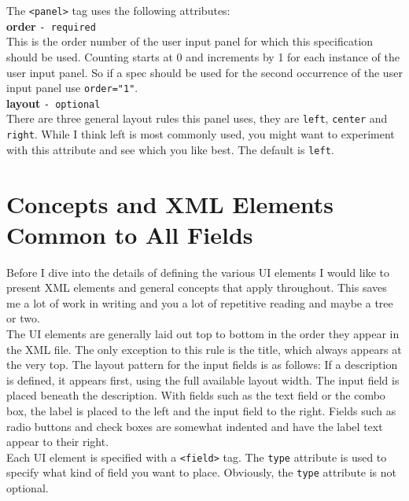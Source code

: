 The \texttt{<panel>} tag uses the following attributes:\\

\textbf{order} \texttt{- required}\\

This is the order number of the user input panel for which this
specification should be used. Counting starts at 0 and increments by 1
for each instance of the user input panel. So if a spec should be used
for the second occurrence of the user input panel use
\texttt{order="1"}.\\

\textbf{layout} \texttt{- optional}\\

There are three general layout rules this panel uses, they are
\texttt{left}, \texttt{center} and \texttt{right}. While I think left is
most commonly used, you might want to experiment with this attribute and
see which you like best. The default is \texttt{left}.\\


\section{Concepts and XML Elements Common to All Fields}

Before I dive into the details of defining the various UI elements I
would like to present XML elements and general concepts that apply
throughout. This saves me a lot of work in writing and you a lot of
repetitive reading and maybe a tree or two.\\

The UI elements are generally laid out top to bottom in the order they
appear in the XML file. The only exception to this rule is the title,
which always appears at the very top. The layout pattern for the input
fields is as follows: If a description is defined, it appears first,
using the full available layout width. The input field is placed beneath
the description. With fields such as the text field or the combo box,
the label is placed to the left and the input field to the right. Fields
such as radio buttons and check boxes are somewhat indented and have the
label text appear to their right.\\

Each UI element is specified with a \texttt{<field>} tag. The
\texttt{type} attribute is used to specify what kind of field you want
to place. Obviously, the \texttt{type} attribute is not optional.\\


